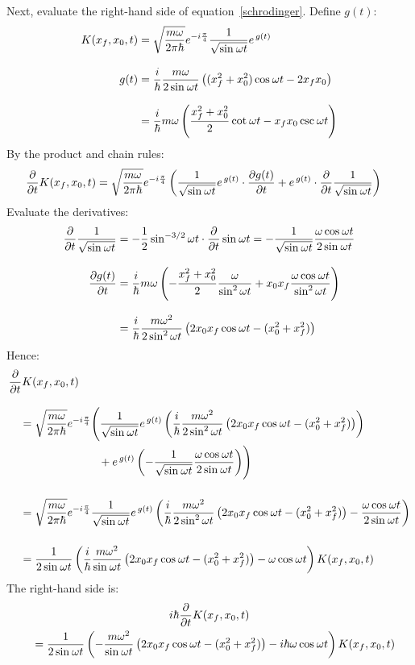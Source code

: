 Next, evaluate the right-hand side of equation~\ref{schrodinger}.
Define $g(t)$:
\begin{align*}
  \propagator
   & =
  \sqrt{\frac{m\w}{2\pi\hbar}} e^{-i\frac{\pi}{4}} \frac{1}{\sqrt{\sinwt}} e^{\,g(t)}
  \\[2ex]
  g(t)
   & =
  \ihbar\frac{m\w }{2\sinwt}\left((x_f^2 + x_0^2)\coswt - 2x_f x_0\right)
  \\[2ex]
   & =
  \ihbar m\w\left( \frac{x_f^2 + x_0^2}{2}\cotwt - x_f x_0\cscwt \right)
\end{align*}
By the product and chain rules:
\begin{align*}
  \del{t}\propagator
   & =
  \sqrt{\frac{m\w}{2\pi\hbar}} e^{-i\frac{\pi}{4}}
  \left(
  \frac{1}{\sqrt{\sinwt}} e^{\,g(t)}\cdot\del[g(t)]{t} +
  e^{\,g(t)}\cdot\del{t}\frac{1}{\sqrt{\sinwt}}
  \right)
\end{align*}
Evaluate the derivatives:
\begin{align*}
  \del{t}\frac{1}{\sqrt{\sinwt}}
   & =
  -\half\sinwt[-3/2]\cdot\del{t}\sinwt
  =
  -\frac{1}{\sqrt{\sinwt}}\frac{\w\coswt}{2\sinwt}
  \\[2ex]
  \del[g(t)]{t}
   & =
  \ihbar m\w \left(
  -\frac{x_f^2 + x_0^2}{2}\frac{\w}{\sinwt[2]} +
  x_0 x_f \frac{\w\coswt}{\sinwt[2]}
  \right)
  \\[2ex]
   & =
  \ihbar \frac{m\w^2}{2\sinwt[2]}\left(2x_0 x_f\coswt - (x_0^2 + x_f^2)\right)
\end{align*}
Hence:
\begin{align*}
   & \del{t}\propagator
  \\[2ex]
   & \quad =
  \sqrt{\frac{m\w}{2\pi\hbar}}
  e^{-i\frac{\pi}{4}}
  \Biggl(
  \frac{1}{\sqrt{\sinwt}}
  e^{\,g(t)}
  \left(
  \ihbar\frac{m\w^2}{2\sinwt[2]}\left(2x_0 x_f\coswt - (x_0^2 + x_f^2)\right)
  \right)
  \\
   & \qquad\qquad\qquad\qquad
  + e^{\,g(t)}
  \left(
  -\frac{1}{\sqrt{\sinwt}}\frac{\w\coswt}{2\sinwt}
  \right)
  \Biggr)
  \\[3ex]
   & \quad  =
  \sqrt{\frac{m\w}{2\pi\hbar}} e^{-i\frac{\pi}{4}} \frac{1}{\sqrt{\sinwt}} e^{\,g(t)}
  \left(
  \ihbar\frac{m\w^2}{2\sinwt[2]}\left(2x_0 x_f\coswt - (x_0^2 + x_f^2)\right) -
  \frac{\w\coswt}{2\sinwt}
  \right)
  \\[3ex]
   & \quad  =
  \frac{1}{2\sinwt}
  \left(
  \ihbar\frac{m\w^2}{\sinwt}\left(2x_0 x_f\coswt - (x_0^2 + x_f^2)\right) -
  \w\coswt
  \right)
  \propagator
\end{align*}
The right-hand side is:
\begin{multline}
  i\hbar\del{t}\propagator
  \\
  \label{rhs}
  \quad =
  \frac{1}{2\sinwt}
  \left(
  -\frac{m\w^2}{\sinwt}\left(2x_0 x_f\coswt - (x_0^2 + x_f^2)\right) -
  i\hbar\w\coswt
  \right)
  \propagator
\end{multline}
